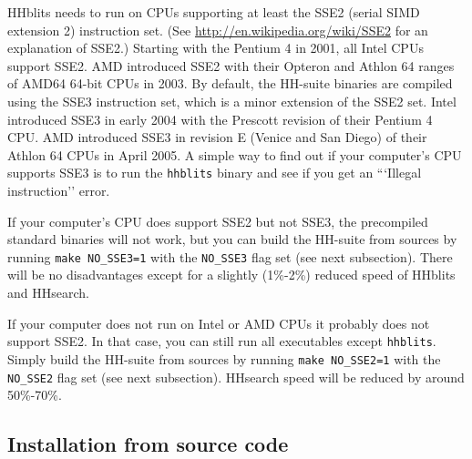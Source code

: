 \documentclass[11pt,a4paper]{article}
\begin{document}
HHblits needs to run on CPUs supporting at least the SSE2 (serial SIMD extension 2) instruction set. (See \url{http://en.wikipedia.org/wiki/SSE2} for an explanation of SSE2.) Starting with the Pentium 4 in 2001, all Intel CPUs support SSE2. AMD introduced SSE2 with their Opteron and Athlon 64 ranges of AMD64 64-bit CPUs in 2003. By default, the HH-suite binaries are compiled using the SSE3 instruction set, which is a minor extension of the SSE2 set. Intel introduced SSE3 in early 2004 with the Prescott revision of their Pentium 4 CPU. AMD introduced SSE3 in revision E (Venice and San Diego) of their Athlon 64 CPUs in April 2005. A simple way to find out if your computer's CPU supports SSE3 is to run the \verb`hhblits` binary and see if you get an ```Illegal instruction'' error.

If your computer's CPU does support SSE2 but not SSE3, the precompiled standard binaries will not work, but you can build the HH-suite from sources by running \verb`make NO_SSE3=1` with the \verb`NO_SSE3` flag set (see next subsection). There will be no disadvantages except for a slightly (1\%-2\%) reduced speed of HHblits and HHsearch.

If your computer does not run on Intel or AMD CPUs it probably does not support SSE2. In that case, you can still run all executables except \verb`hhblits`. Simply build the HH-suite from sources by running \verb`make NO_SSE2=1` with the \verb`NO_SSE2` flag set (see next subsection). HHsearch speed will be reduced by around 50\%-70\%.

\subsection{Installation from source code} \label{installation}

\newenvironment{enum}
 {\begin{list}{\arabic{mycounter}.~~}{\usecounter{mycounter} \labelsep=0em \labelwidth=0em \leftmargin=0em \itemindent=0em}}
 {\end{list}}
\end{document}
